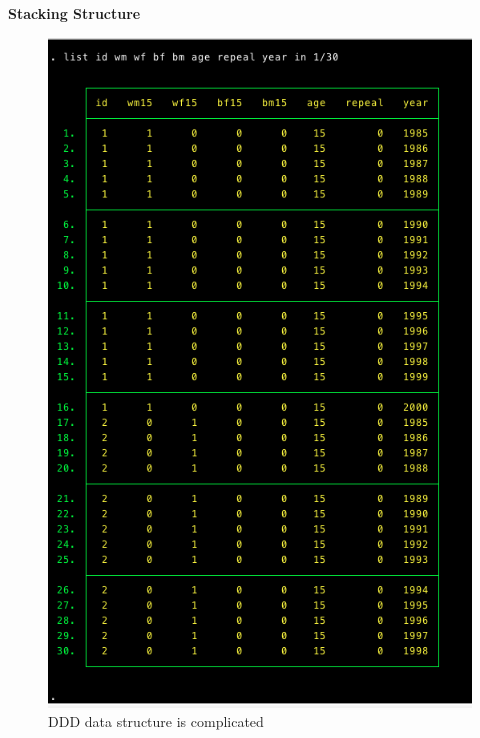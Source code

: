 \documentclass[notes=show]{beamer}
\begin{document}
\begin{frame}[plain]
\begin{center}
\textbf{Stacking Structure}
\end{center}

\begin{figure}
	\includegraphics[scale=0.5]{./lecture_includes/abortion_structure}
	\caption{DDD data structure is complicated}
	\end{figure}

\end{frame}
\end{document}
